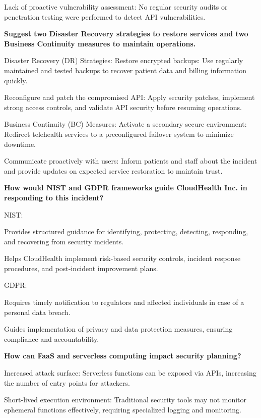 Lack of proactive vulnerability assessment: No regular security audits or penetration testing were performed to detect API vulnerabilities.

\bigskip

\noindent\textbf{Suggest two Disaster Recovery strategies to restore services and two Business Continuity measures to maintain operations.}

Disaster Recovery (DR) Strategies: Restore encrypted backups: Use regularly maintained and tested backups to recover patient data and billing information quickly.

Reconfigure and patch the compromised API: Apply security patches, implement strong access controls, and validate API security before resuming operations.

Business Continuity (BC) Measures: Activate a secondary secure environment: Redirect telehealth services to a preconfigured failover system to minimize downtime.

Communicate proactively with users: Inform patients and staff about the incident and provide updates on expected service restoration to maintain trust.

\bigskip

\noindent\textbf{How would NIST and GDPR frameworks guide CloudHealth Inc. in responding to this incident?}

NIST:

Provides structured guidance for identifying, protecting, detecting, responding, and recovering from security incidents.

Helps CloudHealth implement risk-based security controls, incident response procedures, and post-incident improvement plans.

GDPR:

Requires timely notification to regulators and affected individuals in case of a personal data breach.

Guides implementation of privacy and data protection measures, ensuring compliance and accountability.

\bigskip

\noindent\textbf{How can FaaS and serverless computing impact security planning?}

Increased attack surface: Serverless functions can be exposed via APIs, increasing the number of entry points for attackers.

Short-lived execution environment: Traditional security tools may not monitor ephemeral functions effectively, requiring specialized logging and monitoring.

